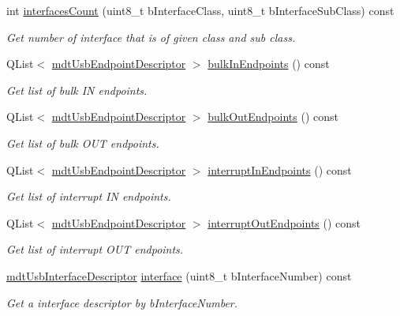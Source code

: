 \begin{DoxyCompactItemize}
int \hyperlink{classmdt_usb_device_descriptor_afb6b86c81a498989a081fe212ebb73d7}{interfaces\-Count} (uint8\-\_\-t b\-Interface\-Class, uint8\-\_\-t b\-Interface\-Sub\-Class) const 
\begin{DoxyCompactList}\small\item\em Get number of interface that is of given class and sub class. \end{DoxyCompactList}\item 
Q\-List$<$ \hyperlink{classmdt_usb_endpoint_descriptor}{mdt\-Usb\-Endpoint\-Descriptor} $>$ \hyperlink{classmdt_usb_device_descriptor_a489b54e97f000b6119fcec62a1e7effc}{bulk\-In\-Endpoints} () const 
\begin{DoxyCompactList}\small\item\em Get list of bulk I\-N endpoints. \end{DoxyCompactList}\item 
Q\-List$<$ \hyperlink{classmdt_usb_endpoint_descriptor}{mdt\-Usb\-Endpoint\-Descriptor} $>$ \hyperlink{classmdt_usb_device_descriptor_a7b5054b5185817bf9773f2d3e6aab925}{bulk\-Out\-Endpoints} () const 
\begin{DoxyCompactList}\small\item\em Get list of bulk O\-U\-T endpoints. \end{DoxyCompactList}\item 
Q\-List$<$ \hyperlink{classmdt_usb_endpoint_descriptor}{mdt\-Usb\-Endpoint\-Descriptor} $>$ \hyperlink{classmdt_usb_device_descriptor_a9c8991bb823ca7c51c917858894071af}{interrupt\-In\-Endpoints} () const 
\begin{DoxyCompactList}\small\item\em Get list of interrupt I\-N endpoints. \end{DoxyCompactList}\item 
Q\-List$<$ \hyperlink{classmdt_usb_endpoint_descriptor}{mdt\-Usb\-Endpoint\-Descriptor} $>$ \hyperlink{classmdt_usb_device_descriptor_a5d2faed9ce97f05a0ddf5b71da48a858}{interrupt\-Out\-Endpoints} () const 
\begin{DoxyCompactList}\small\item\em Get list of interrupt O\-U\-T endpoints. \end{DoxyCompactList}\item 
\hyperlink{classmdt_usb_interface_descriptor}{mdt\-Usb\-Interface\-Descriptor} \hyperlink{classmdt_usb_device_descriptor_aeba19e7e0267510f46ae21251527ed1f}{interface} (uint8\-\_\-t b\-Interface\-Number) const 
\begin{DoxyCompactList}\small\item\em Get a interface descriptor by b\-Interface\-Number. \end{DoxyCompactList}\item 

\end{DoxyCompactItemize}
